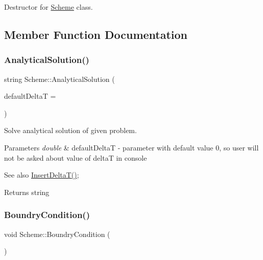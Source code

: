 Destructor for \mbox{\hyperlink{class_scheme}{Scheme}} class. 

\subsection{Member Function Documentation}
\mbox{\label{class_scheme_a7d3e9f8133a955517471eb7a6fea355f}} 
\subsubsection{\texorpdfstring{Analytical\+Solution()}{AnalyticalSolution()}}
{\footnotesize\ttfamily string Scheme\+::\+Analytical\+Solution (\begin{DoxyParamCaption}\item[{double}]{default\+DeltaT = {} }\end{DoxyParamCaption})}

Solve analytical solution of given problem. 
\begin{DoxyParams}{Parameters}
{\em double} & default\+DeltaT -\/ parameter with default value 0, so user will not be asked about value of deltaT in console \\
\hline
\end{DoxyParams}
\begin{DoxySeeAlso}{See also}
\mbox{\hyperlink{class_scheme_ac5803e4951dc125b274f543d5037c21d}{Insert\+Delta\+T()}}; 
\end{DoxySeeAlso}
\begin{DoxyReturn}{Returns}
string 
\end{DoxyReturn}
\mbox{\label{class_scheme_a36885039937c25f13c8daea654e37b97}} 
\subsubsection{\texorpdfstring{Boundry\+Condition()}{BoundryCondition()}}
{\footnotesize\ttfamily void Scheme\+::\+Boundry\+Condition (\begin{DoxyParamCaption}{ }\end{DoxyParamCaption})\hspace{0.3cm}{\ttfamily [protected]}}

